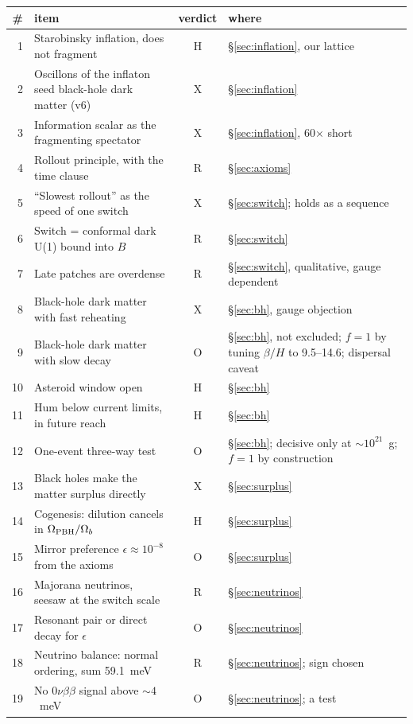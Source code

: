 \documentclass[11pt,a4paper]{article}
\begin{document}
{\small
\begin{longtable}{@{}rp{8.4cm}cp{4.6cm}@{}}
\toprule
\# & item & verdict & where \\
\midrule
\endhead
1 & Starobinsky inflation, does not fragment & H & \S\ref{sec:inflation}, our lattice \\
2 & Oscillons of the inflaton seed black-hole dark matter (v6) & X & \S\ref{sec:inflation} \\
3 & Information scalar as the fragmenting spectator & X & \S\ref{sec:inflation}, 60$\times$ short \\
4 & Rollout principle, with the time clause & R & \S\ref{sec:axioms} \\
5 & ``Slowest rollout'' as the speed of one switch & X & \S\ref{sec:switch}; holds as a sequence \\
6 & Switch = conformal dark U(1) bound into $B$ & R & \S\ref{sec:switch} \\
7 & Late patches are overdense & R & \S\ref{sec:switch}, qualitative, gauge dependent \\
8 & Black-hole dark matter with fast reheating & X & \S\ref{sec:bh}, gauge objection \\
9 & Black-hole dark matter with slow decay & O & \S\ref{sec:bh}, not excluded; $f=1$ by tuning $\beta/H$ to 9.5--14.6; dispersal caveat \\
10 & Asteroid window open & H & \S\ref{sec:bh} \\
11 & Hum below current limits, in future reach & H & \S\ref{sec:bh} \\
12 & One-event three-way test & O & \S\ref{sec:bh}; decisive only at $\sim10^{21}$~g; $f=1$ by construction \\
13 & Black holes make the matter surplus directly & X & \S\ref{sec:surplus} \\
14 & Cogenesis: dilution cancels in $\Omega_{\rm PBH}/\Omega_b$ & H & \S\ref{sec:surplus} \\
15 & Mirror preference $\epsilon\approx10^{-8}$ from the axioms & O & \S\ref{sec:surplus} \\
16 & Majorana neutrinos, seesaw at the switch scale & R & \S\ref{sec:neutrinos} \\
17 & Resonant pair or direct decay for $\epsilon$ & O & \S\ref{sec:neutrinos} \\
18 & Neutrino balance: normal ordering, sum 59.1~meV & R & \S\ref{sec:neutrinos}; sign chosen \\
19 & No $0\nu\beta\beta$ signal above $\sim4$~meV & O & \S\ref{sec:neutrinos}; a test \\

\end{longtable}}
\end{document}

